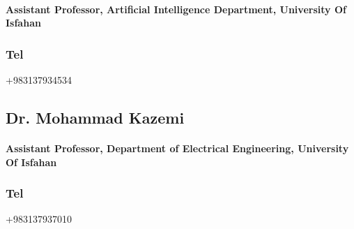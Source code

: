 \documentclass[a4paper]{article}
\begin{document}
        \paragraph{\bfseries Assistant Professor, Artificial Intelligence Department, University Of Isfahan}
        \subsubsection{\large Tel} {\large +983137934534}
        
        \Large\href{mailto:h.karshenas@eng.ui.ac.ir}{}
        \Large\href{https://engold.ui.ac.ir/~h.karshenas}{}
        \Large\href{https://ir.linkedin.com/in/hossein-karshenas-01102a55}{}

        \subsection{Dr. Mohammad Kazemi}

        \paragraph{\bfseries Assistant Professor, Department of Electrical Engineering, University Of Isfahan}
        \subsubsection{\large Tel} {\large +983137937010}
        
        \Large\href{mailto:m.kazemi@eng.ui.ac.ir}{}
        \Large\href{https://engold.ui.ac.ir/~m.kazemi}{}
        \Large\href{https://ir.linkedin.com/in/mohammad-kazemi-602a2722}{}
\end{document}
